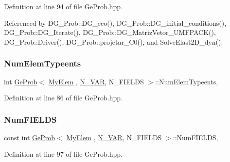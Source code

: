 Definition at line 94 of file Ge\+Prob.\+hpp.



Referenced by D\+G\+\_\+\+Prob\+::\+D\+G\+\_\+eco(), D\+G\+\_\+\+Prob\+::\+D\+G\+\_\+initial\+\_\+conditions(), D\+G\+\_\+\+Prob\+::\+D\+G\+\_\+\+Iterate(), D\+G\+\_\+\+Prob\+::\+D\+G\+\_\+\+Matriz\+Vetor\+\_\+\+U\+M\+F\+P\+A\+C\+K(), D\+G\+\_\+\+Prob\+::\+Driver(), D\+G\+\_\+\+Prob\+::projetar\+\_\+\+C0(), and Solve\+Elast2\+D\+\_\+dyn().

\mbox{\label{classGeProb_a1555edf9114f6b65ef9a7820dfc16e63}} 
\subsubsection{\texorpdfstring{Num\+Elem\+Typeents}{NumElemTypeents}}
{\footnotesize\ttfamily int \hyperlink{classGeProb}{Ge\+Prob}$<$ \hyperlink{DG__Prob_8h_a83cd887ced9a6587428f267e50cd4787}{My\+Elem} , \hyperlink{classED__Prob_a4e7d2ff1a8e435e336fb00c527224b5a}{N\+\_\+\+V\+AR}, N\+\_\+\+F\+I\+E\+L\+DS $>$\+::Num\+Elem\+Typeents\hspace{0.3cm}{\ttfamily [protected]}, {\ttfamily [inherited]}}



Definition at line 86 of file Ge\+Prob.\+hpp.

\mbox{\label{classGeProb_adede55ee31a140d1cd8a9076ecdc41e1}} 
\subsubsection{\texorpdfstring{Num\+F\+I\+E\+L\+DS}{NumFIELDS}}
{\footnotesize\ttfamily const int \hyperlink{classGeProb}{Ge\+Prob}$<$ \hyperlink{DG__Prob_8h_a83cd887ced9a6587428f267e50cd4787}{My\+Elem} , \hyperlink{classED__Prob_a4e7d2ff1a8e435e336fb00c527224b5a}{N\+\_\+\+V\+AR}, N\+\_\+\+F\+I\+E\+L\+DS $>$\+::Num\+F\+I\+E\+L\+DS\hspace{0.3cm}{\ttfamily [protected]}, {\ttfamily [inherited]}}



Definition at line 97 of file Ge\+Prob.\+hpp.



